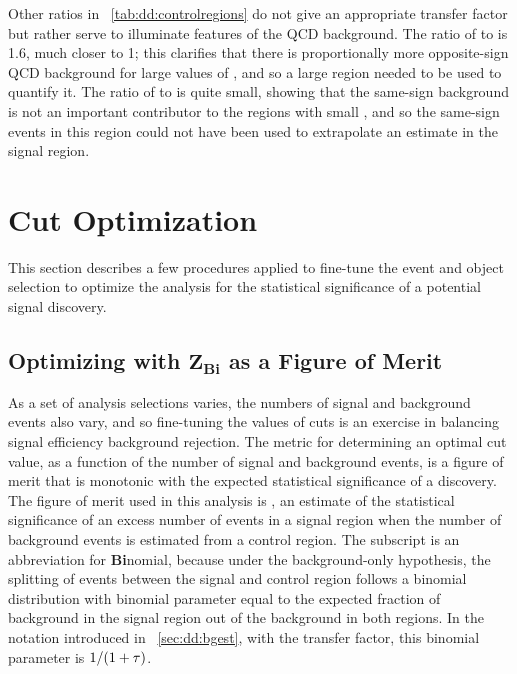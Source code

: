 Other ratios in \Tab~\ref{tab:dd:controlregions} do not give an appropriate transfer factor but rather serve to illuminate features of the QCD background.
The ratio of  to  is 1.6, much closer to 1; this clarifies that there is proportionally more opposite-sign QCD background for large values of \LxySig, and so a large \LxySig region needed to be used to quantify it.
The ratio of  to  is quite small, showing that the same-sign background is not an important contributor to the regions with small \LxySig, and so the same-sign events in this region could not have been used to extrapolate an estimate in the signal region.

\section{Cut Optimization}
This section describes a few procedures applied to fine-tune the event and object selection to optimize the analysis for the statistical significance of a potential signal discovery.

\subsection[Optimizing with \ZBi as a Figure of Merit]{Optimizing with \texorpdfstring{$\bm{Z_{\mathbf{Bi}}}$}{ZBi} as a Figure of Merit}
\label{sec:dd:cutopt_ZBi}
As a set of analysis selections varies, the numbers of signal and background events also vary, and so fine-tuning the values of cuts is an exercise in balancing signal efficiency \vs background rejection.
The metric for determining an optimal cut value, as a function of the number of signal and background events, is a figure of merit that is monotonic with the expected statistical significance of a discovery.
The figure of merit used in this analysis is \ZBi \cite{Cousins:ZBi2008}, an estimate of the statistical significance of an excess number of events in a signal region when the number of background events is estimated from a control region.
The subscript is an abbreviation for \textbf{Bi}nomial, because under the background-only hypothesis, the splitting of events between the signal and control region follows a binomial distribution with binomial parameter equal to the expected fraction of background in the signal region out of the background in both regions.
In the notation introduced in \Sec~\ref{sec:dd:bgest}, with \TF the transfer factor, this binomial parameter is $1/(1+\tau)$.

